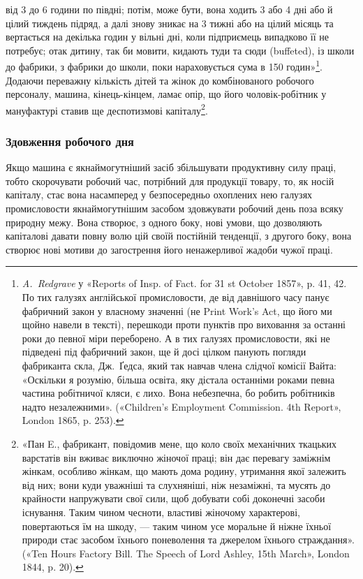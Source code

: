 від 3 до 6 години по півдні; потім, може бути, вона ходить 3 або 4 дні
або й цілий тиждень підряд, а далі знову зникає на 3 тижні або
на цілий місяць та вертається на декілька годин у вільні дні,
коли підприємець випадково її не потребує; отак дитину, так би
мовити, кидають туди та сюди (buffeted), із школи до фабрики,
з фабрики до школи, поки нараховується сума в 150 годин»\footnote{
\emph{A.~Redgrave} у «Reports of Insp. of Fact. for 31 st October
1857», p. 41, 42. По тих галузях англійської промисловости, де від давнішого
часу панує фабричний закон у власному значенні (не Print Work's
Act, що його ми щойно навели в тексті), перешкоди проти пунктів про
виховання за останні роки до певної міри переборено. А в тих галузях
промисловости, які не підведені під фабричний закон, ще й досі цілком
панують погляди фабриканта скла, Дж.~Ґедса, який так навчав члена слідчої
комісії Вайта: «Оскільки я розумію, більша освіта, яку дістала останніми
роками певна частина робітничої кляси, є лихо. Вона небезпечна,
бо робить робітників надто незалежними». («Children’s Employment Commission.
4th Report», London 1865, p. 253).
}.
Додаючи переважну кількість дітей та жінок до комбінованого
робочого персоналу, машина, кінець-кінцем, ламає опір, що
його чоловік-робітник у мануфактурі ставив ще деспотизмові
капіталу\footnote{
«Пан E., фабрикант, повідомив мене, що коло своїх механічних
ткацьких варстатів він вживає виключно жіночої праці; він дає перевагу
заміжнім жінкам, особливо жінкам, що мають дома родину, утримання
якої залежить від них; вони куди уважніші та слухняніші, ніж незаміжні,
та мусять до крайности напружувати свої сили, щоб добувати собі доконечні
засоби існування. Таким чином чесноти, властиві жіночому характерові,
повертаються їм на шкоду, — таким чином усе моральне й ніжне
їхньої природи стає засобом їхнього поневолення та джерелом їхнього
страждання». («Ten Hours Factory Bill. The Speech of Lord Ashley, 15th
March», London 1844, p. 20).
}.

\subsubsection{Здовження робочого дня}

Якщо машина є якнаймогутніший засіб збільшувати продуктивну
силу праці, тобто скорочувати робочий час, потрібний для
продукції товару, то, як носій капіталу, стає вона насамперед
у безпосередньо охоплених нею галузях промисловости якнаймогутнішим
засобом здовжувати робочий день поза всяку природну
межу. Вона створює, з одного боку, нові умови, що дозволяють
капіталові давати повну волю цій своїй постійній тенденції,
з другого боку, вона створює нові мотиви до загострення його
ненажерливої жадоби чужої праці.

